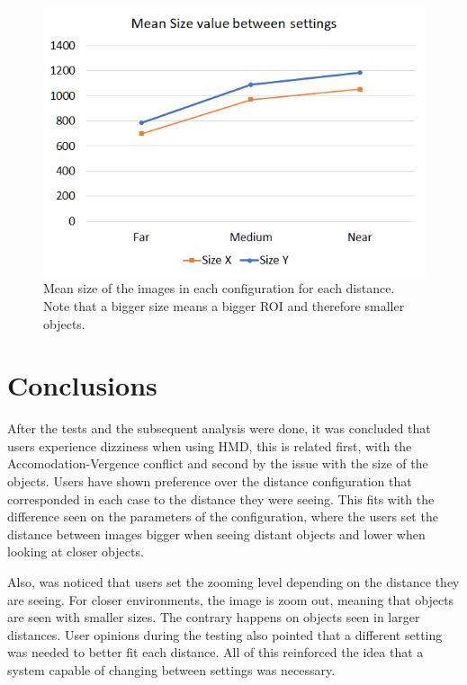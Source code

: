 \documentclass[10pt,a4paper,twocolumn,twoside]{article}
\begin{document}
	\begin{figure}
		\centering
		\includegraphics[width=1\linewidth]{img/userTestingSizechart.png}
		\caption{Mean size of the images in each configuration for each distance. Note that a bigger size means a bigger ROI and therefore smaller objects.}
		\label{fig:ut:2:size}
	\end{figure}


	
	\section{Conclusions}
	After the tests and the subsequent analysis were done, it was concluded that users experience dizziness when using HMD, this is related first, with the Accomodation-Vergence conflict and second by the issue with the size of the objects.
	Users have shown preference over the distance configuration that corresponded in each case to the distance they were seeing. This fits with the difference seen on the parameters of the configuration, where the users set the distance between images bigger when seeing distant objects and lower when looking at closer objects. 
	
	Also, was noticed that users set the zooming level depending on the distance they are seeing. For closer environments, the image is zoom out, meaning that objects are seen with smaller sizes. The contrary happens on objects seen in larger distances. User opinions during the testing also pointed that a different setting was needed to better fit each distance. All of this reinforced the idea that a system capable of changing between settings was necessary. 
	
\end{document}
